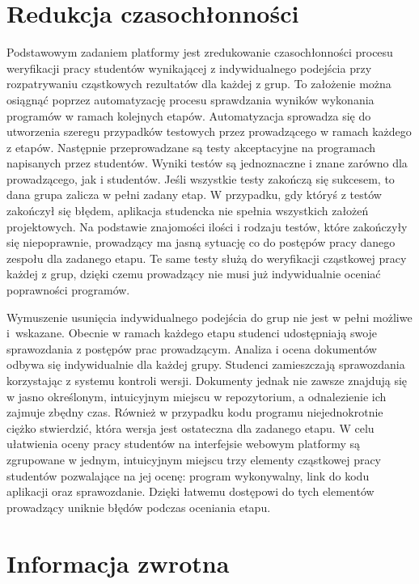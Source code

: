 \section{Redukcja czasochłonności}

Podstawowym zadaniem platformy jest zredukowanie czasochłonności procesu weryfikacji pracy studentów wynikającej z indywidualnego podejścia przy rozpatrywaniu cząstkowych rezultatów dla każdej z grup.
To założenie można osiągnąć poprzez automatyzację procesu sprawdzania wyników wykonania programów w ramach kolejnych etapów.
Automatyzacja sprowadza się do utworzenia szeregu przypadków testowych przez prowadzącego w ramach każdego z etapów.
Następnie przeprowadzane są testy akceptacyjne na programach napisanych przez studentów.
Wyniki testów są jednoznaczne i znane zarówno dla prowadzącego, jak i studentów.
Jeśli wszystkie testy zakończą się sukcesem, to dana grupa zalicza w pełni zadany etap.
W przypadku, gdy któryś z testów zakończył się błędem, aplikacja studencka nie spełnia wszystkich założeń projektowych.
Na podstawie znajomości ilości i rodzaju testów, które zakończyły się niepoprawnie, prowadzący ma jasną sytuację co do postępów pracy danego zespołu dla zadanego etapu.
Te same testy służą do weryfikacji cząstkowej pracy każdej z grup, dzięki czemu prowadzący nie musi już indywidualnie oceniać poprawności programów.

Wymuszenie usunięcia indywidualnego podejścia do grup nie jest w pełni możliwe i~wskazane.
Obecnie w ramach każdego etapu studenci udostępniają swoje sprawozdania z postępów prac prowadzącym.
Analiza i ocena dokumentów odbywa się indywidualnie dla każdej grupy.
Studenci zamieszczają sprawozdania korzystając z systemu kontroli wersji.
Dokumenty jednak nie zawsze znajdują się w jasno określonym, intuicyjnym miejscu w repozytorium, a odnalezienie ich zajmuje zbędny czas.
Również w przypadku kodu programu niejednokrotnie ciężko stwierdzić, która wersja jest ostateczna dla zadanego etapu.
W celu ułatwienia oceny pracy studentów na interfejsie webowym platformy są zgrupowane w jednym, intuicyjnym miejscu trzy elementy cząstkowej pracy studentów pozwalające na jej ocenę: program wykonywalny, link do kodu aplikacji oraz sprawozdanie.
Dzięki łatwemu dostępowi do tych elementów prowadzący uniknie błędów podczas oceniania etapu.


\section{Informacja zwrotna}

